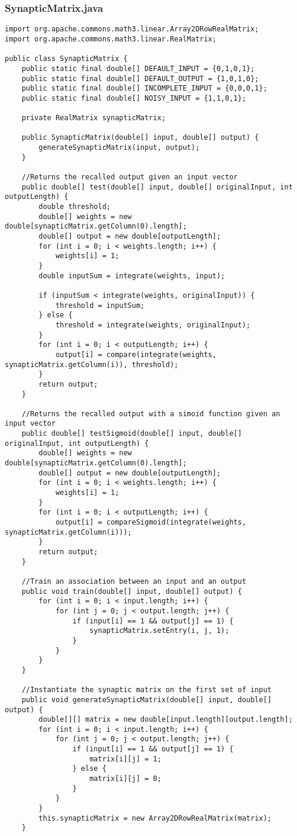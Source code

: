 \documentclass{article}
\begin{document}
\subsubsection*{SynapticMatrix.java}
\begin{lstlisting}
import org.apache.commons.math3.linear.Array2DRowRealMatrix;
import org.apache.commons.math3.linear.RealMatrix;

public class SynapticMatrix {
	public static final double[] DEFAULT_INPUT = {0,1,0,1};
	public static final double[] DEFAULT_OUTPUT = {1,0,1,0};
	public static final double[] INCOMPLETE_INPUT = {0,0,0,1};
	public static final double[] NOISY_INPUT = {1,1,0,1};
	
	private RealMatrix synapticMatrix;
	
	public SynapticMatrix(double[] input, double[] output) {
		generateSynapticMatrix(input, output);
	}
	
	//Returns the recalled output given an input vector
	public double[] test(double[] input, double[] originalInput, int outputLength) {
		double threshold;
		double[] weights = new double[synapticMatrix.getColumn(0).length];
		double[] output = new double[outputLength];
		for (int i = 0; i < weights.length; i++) {
			weights[i] = 1;
		}
		double inputSum = integrate(weights, input);

		if (inputSum < integrate(weights, originalInput)) {
			threshold = inputSum;
		} else {
			threshold = integrate(weights, originalInput);
		}
		for (int i = 0; i < outputLength; i++) {
			output[i] = compare(integrate(weights, synapticMatrix.getColumn(i)), threshold);
		}
		return output;
	}
	
	//Returns the recalled output with a simoid function given an input vector
	public double[] testSigmoid(double[] input, double[] originalInput, int outputLength) {
		double[] weights = new double[synapticMatrix.getColumn(0).length];
		double[] output = new double[outputLength];
		for (int i = 0; i < weights.length; i++) {
			weights[i] = 1;
		}
		for (int i = 0; i < outputLength; i++) {
			output[i] = compareSigmoid(integrate(weights, synapticMatrix.getColumn(i)));
		}
		return output;
	}
	
	//Train an association between an input and an output
	public void train(double[] input, double[] output) {
		for (int i = 0; i < input.length; i++) {
			for (int j = 0; j < output.length; j++) {
				if (input[i] == 1 && output[j] == 1) {
					synapticMatrix.setEntry(i, j, 1);
				}
			}
		}
	}
	
	//Instantiate the synaptic matrix on the first set of input
	public void generateSynapticMatrix(double[] input, double[] output) {
		double[][] matrix = new double[input.length][output.length];
		for (int i = 0; i < input.length; i++) {
			for (int j = 0; j < output.length; j++) {
				if (input[i] == 1 && output[j] == 1) {
					matrix[i][j] = 1;
				} else {
					matrix[i][j] = 0;
				}
			}
		}
		this.synapticMatrix = new Array2DRowRealMatrix(matrix);
	}
	

\end{lstlisting}
\end{document}
